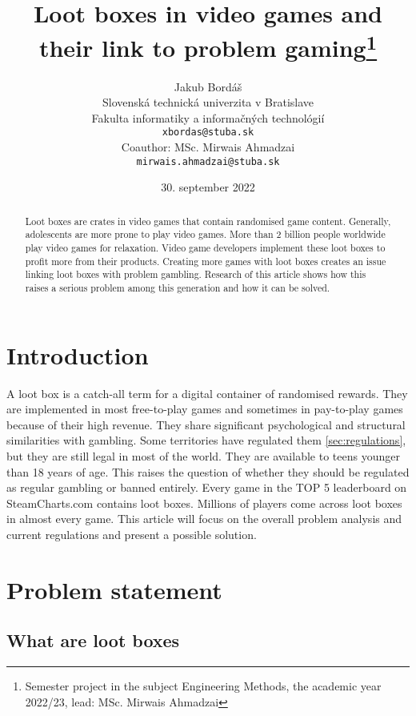 \documentclass[10pt,oneside,english,a4paper]{article}
\title{Loot boxes in video games and their link to problem gaming\thanks{Semester project in the subject Engineering Methods, the academic year 2022/23, lead: MSc. Mirwais Ahmadzai}} %
\author{Jakub Bordáš\\[2pt]
	{\small Slovenská technická univerzita v Bratislave}\\
	{\small Fakulta informatiky a informačných technológií}\\
	{\small \texttt{xbordas@stuba.sk}}\\
	{\small Coauthor: MSc. Mirwais Ahmadzai}\\
	{\small \texttt{mirwais.ahmadzai@stuba.sk}}
	}
\date{\small 30. september 2022} %
\begin{document}
\maketitle

\begin{abstract}
Loot boxes are crates in video games that contain randomised game content. Generally, adolescents are more prone to play video games. More than 2 billion people worldwide play video games for relaxation. Video game developers implement these loot boxes to profit more from their products. Creating more games with loot boxes creates an issue linking loot boxes with problem gambling. Research of this article shows how this raises a serious problem among this generation and how it can be solved.
\end{abstract}



\section{Introduction}

A loot box is a catch-all term for a digital container of randomised rewards. They are implemented in most free-to-play games and sometimes in pay-to-play games because of their high revenue. They share significant psychological and structural similarities with gambling. Some territories have regulated them \ref{sec:regulations}, but they are still legal in most of the world. They are available to teens younger than 18 years of age. This raises the question of whether they should be regulated as regular gambling or banned entirely. Every game in the TOP 5 leaderboard on SteamCharts.com\cite{steamcharts} contains loot boxes. Millions of players\cite{springer:research} come across loot boxes in almost every game. This article will focus on the overall problem analysis and current regulations and present a possible solution.
\pagebreak


\section{Problem statement} \label{sec:problemstatement}

\subsection{What are loot boxes} \label{sec:what}
\end{document}
